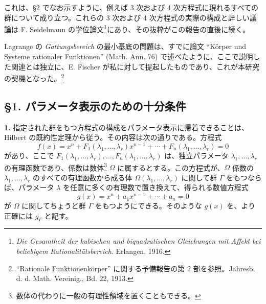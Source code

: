 \documentclass[11pt]{article}
\begin{document}
これは、\S 2 でなお示すように、例えば 3 次および 4 次方程式に現れるすべての群について成り立つ。これらの 3 次および 4 次方程式の実際の構成と詳しい議論は F. Seidelmann の学位論文\footnote{\emph{Die Gesamtheit der kubischen und biquadratischen Gleichungen mit Affekt bei beliebigem Rationalitätsbereich}. Erlangen, 1916.}にあり、その抜粋がこの報告の直後に続く。

Lagrange の \emph{Gattungsbereich} の最小基底の問題は、すでに論文 ``Körper und Systeme rationaler Funktionen'' (Math. Ann. 76) で述べたように、ここで説明した関連とは独立に、E. Fischer が私に対して提起したものであり、これが本研究の契機となった。\footnote{``Rationale Funktionenkörper'' に関する予備報告の第 2 部を参照。Jahresb. d. d. Math. Vereinig., Bd. 22, 1913.}

\subsection*{\S 1. パラメータ表示のための十分条件}

\textbf{1.} 指定された群をもつ方程式の構成をパラメータ表示に帰着できることは、Hilbert の既約性定理から従う。その内容は次の通りである。方程式
\begin{equation}\tag{1}
f(x)=x^n+F_1(\lambda_1,\ldots,\lambda_r)x^{n-1}+\cdots+F_n(\lambda_1,\ldots,\lambda_r)=0
\end{equation}
があり、ここで $F_1(\lambda_1,
\ldots,\lambda_r),\ldots,F_n(\lambda_1,
\ldots,\lambda_r)$ は、独立パラメータ $\lambda_1,
\ldots,\lambda_r$ の有理函数であり、係数は数体\footnote{数体の代わりに一般の有理性領域を置くこともできる。} $\Omega$ に属するとする。この方程式が、$\Omega$ 係数の $\lambda_1,
\ldots,\lambda_r$ のすべての有理函数から成る体 $\Omega(\lambda_1,
\ldots,\lambda_r)$ に関して群 $\Gamma$ をもつならば、パラメータ $\lambda$ を任意に多くの有理数で置き換えて、得られる数値方程式
\begin{equation}\tag{2}
g(x)=x^n+a_1x^{n-1}+\cdots+a_n=0
\end{equation}
が $\Omega$ に関してちょうど群 $\Gamma$ をもつようにできる。そのような $g(x)$ を、より正確には $g_\Gamma$ と記す。
\end{document}
